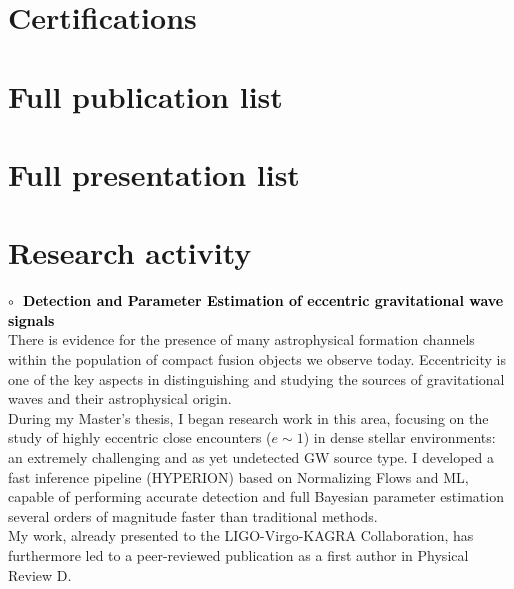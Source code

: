 \section{Certifications}
\vspace{0.2cm}
\vspace{0.2cm}









\pagebreak
\section{Full publication list}\vspace{0.2cm} 




\section{Full presentation list}\vspace{0.2cm} 



\pagebreak
\section{Research activity}
\textbf{\textcolor{black}{\hspace{0.4cm}$\circ\;$ Detection and Parameter Estimation of eccentric gravitational wave signals}}\vspace{0.05cm}\\
\indent There is evidence for the presence of many astrophysical formation channels within the
population of compact fusion objects we observe today.
Eccentricity is one of the key aspects in distinguishing and studying the sources of
gravitational waves and their astrophysical origin.\\
During my Master's thesis, I began research work in this area, focusing on the study of highly
eccentric close encounters ($e\sim1$) in dense stellar environments: an extremely challenging and
as yet undetected GW source type.
I developed a fast inference pipeline (\textsc{HYPERION}) based on Normalizing Flows and ML,
capable of performing accurate detection and full Bayesian parameter estimation several
orders of magnitude faster than traditional methods.\\
My work, already presented to the LIGO-Virgo-KAGRA Collaboration, has furthermore led to a
peer-reviewed publication as a first author in Physical Review D.
\medskip

